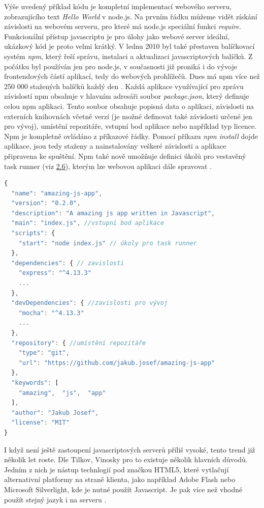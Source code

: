 Výše uvedený příklad kódu je kompletní implementací webového serveru, zobrazujícího text \textit{Hello World} v node.js. Na prvním řádku můžeme vidět získání závislosti na webovém serveru, pro které má node.js speciální funkci \textit{require}. Funkcionální přístup javascriptu je pro úlohy jako webové server ideální, ukázkový kód je proto velmi krátký. V lednu 2010 byl také přestaven balíčkovací systém \textit{npm}, který řeší správu, instalaci a aktualizaci javascriptových balíčků. Z počátku byl používán jen pro node.js, v současnosti již proniká i do vývoje frontendových částí aplikací, tedy do webových prohlížečů. Dnes má npm více než 250 000 stažených balíčků každý den \cite{nodejs_numbers}. Každá aplikace využívající pro zprávu závislostí npm obsahuje v hlavním adresáři soubor \textit{package.json}, který definuje celou npm aplikaci. Tento soubor obsahuje popisná data o aplikaci, závislosti na externích knihovnách včetně verzí (je možné definovat také závislosti určené jen pro vývoj), umístění repozitáře, vstupní bod aplikace nebo například typ licence. Npm je kompletně ovládáno z příkazové řádky. Pomocí příkazu \textit{npm install} dojde   aplikace, jsou tedy staženy a nainstalovány veškeré závislosti a aplikace připravena ke spuštění. Npm také nově umožňuje definici úkolů pro vestavěný task runner (viz \hyperref[sec:task_runner]{2.6}), kterým lze webovou aplikaci dále spravovat \cite{glover_nodejs} \cite{tilkov_nodejs} \cite{npm}.

\begin{lstlisting}[language=Javascript, caption=Soubor package.json definující závislosti pro NPM]
{
  "name": "amazing-js-app",
  "version": "0.2.0",
  "description": "A amazing js app written in Javascript",
  "main": "index.js", //vstupní bod aplikace
  "scripts": {
    "start": "node index.js" // úkoly pro task runner
  },
  "dependencies": { // zavislosti
    "express": "^4.13.3"
    ...
  },
  "devDependencies": { //zavislosti pro vývoj
    "mocha": "^4.13.3"
    ...
  },
  "repository": { //umístění repozitáře
    "type": "git",
    "url": "https://github.com/jakub.josef/amazing-js-app"
  },
  "keywords": [
    "amazing",  "js",  "app"
  ],
  "author": "Jakub Josef",
  "license": "MIT"
}
\end{lstlisting}

I když není ještě zastoupení javascriptových serverů příliš vysoké, tento trend již několik let roste. Dle Tilkov, Vinosky pro to existuje několik hlavních důvodů. Jedním z nich je nástup technlogií pod značkou HTML5, které vytlačují alternativní platformy na straně klienta, jako například Adobe Flash nebo Microsoft Silverlight, kde je nutné použít Javascript. Je pak více než vhodné použít stejný jazyk i na serveru \cite{tilkov_nodejs}.


